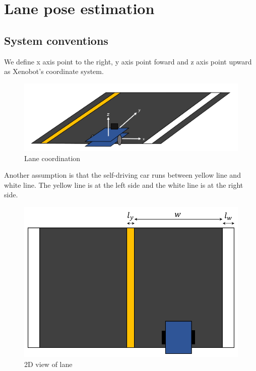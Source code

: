 \documentclass{article}
\begin{document}
\clearpage

\section{Lane pose estimation}

\subsection{System conventions}

We define x axis point to the right, y axis point foward and z axis point upward as Xenobot's coordinate system.

\begin{figure}[ht]
  \label{fig:lane_coordination}
  \centering
  \includegraphics[scale=0.6]{graphs/coordinate_system.PNG}
  \caption{Lane coordination}
\end{figure}
\FloatBarrier

\noindent Another assumption is that the self-driving car runs between yellow line and white line. The yellow line is at the left side and the white line is at the right side.

\begin{figure}[ht]
  \label{fig:lane_2d_view}
  \centering
  \includegraphics[scale=0.6]{graphs/lane_parameter_2d_view.PNG}
  \caption{2D view of lane}
\end{figure}
\FloatBarrier
\end{document}
